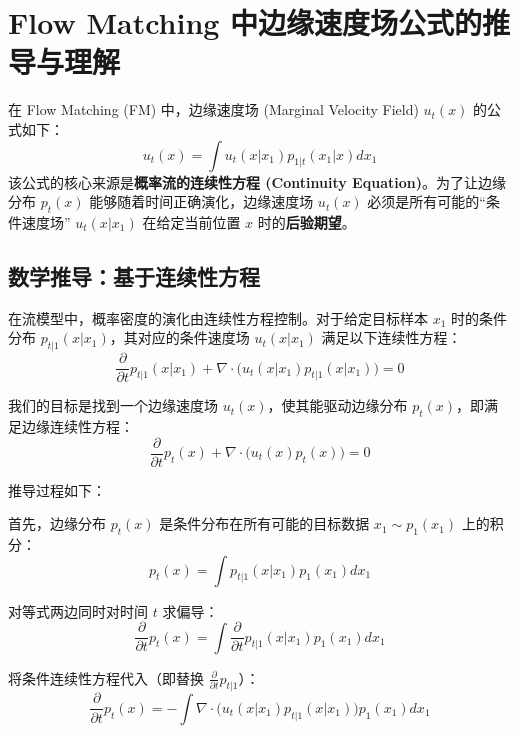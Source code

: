 \section{Flow Matching 中边缘速度场公式的推导与理解}

在 Flow Matching (FM) 中，边缘速度场 (Marginal Velocity Field) $u_t(x)$ 的公式如下：
\begin{equation}
    u_t(x) = \int u_t(x|x_1)p_{1|t}(x_1|x)dx_1
\end{equation}
该公式的核心来源是\textbf{概率流的连续性方程 (Continuity Equation)}。为了让边缘分布 $p_t(x)$ 能够随着时间正确演化，边缘速度场 $u_t(x)$ 必须是所有可能的“条件速度场” $u_t(x|x_1)$ 在给定当前位置 $x$ 时的\textbf{后验期望}。

\subsection{数学推导：基于连续性方程}

在流模型中，概率密度的演化由连续性方程控制。对于给定目标样本 $x_1$ 时的条件分布 $p_{t|1}(x|x_1)$，其对应的条件速度场 $u_t(x|x_1)$ 满足以下连续性方程：
\begin{equation}
    \frac{\partial}{\partial t} p_{t|1}(x|x_1) + \nabla \cdot \big(u_t(x|x_1) p_{t|1}(x|x_1)\big) = 0
\end{equation}

我们的目标是找到一个边缘速度场 $u_t(x)$，使其能驱动边缘分布 $p_t(x)$，即满足边缘连续性方程：
\begin{equation}
    \frac{\partial}{\partial t} p_t(x) + \nabla \cdot \big(u_t(x) p_t(x)\big) = 0
\end{equation}

推导过程如下：

首先，边缘分布 $p_t(x)$ 是条件分布在所有可能的目标数据 $x_1 \sim p_1(x_1)$ 上的积分：
\begin{equation}
    p_t(x) = \int p_{t|1}(x|x_1) p_1(x_1) dx_1
\end{equation}

对等式两边同时对时间 $t$ 求偏导：
\begin{equation}
    \frac{\partial}{\partial t} p_t(x) = \int \frac{\partial}{\partial t} p_{t|1}(x|x_1) p_1(x_1) dx_1
\end{equation}

将条件连续性方程代入（即替换 $\frac{\partial}{\partial t} p_{t|1}$）：
\begin{equation}
    \frac{\partial}{\partial t} p_t(x) = -\int \nabla \cdot \big(u_t(x|x_1) p_{t|1}(x|x_1)\big) p_1(x_1) dx_1
\end{equation}

